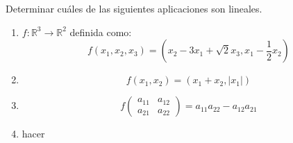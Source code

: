 \begin{enunciado}{\ejercicio}
  Determinar cuáles de las siguientes aplicaciones son lineales.
  \begin{enumerate}[label=(\alph*)]
  \item $f: \mathbb{R}^3 \to \mathbb{R}^2$ definida como:   \[
    f(x_1, x_2, x_3) = (x_2 - 3x_1 + \sqrt{2}x_3, x_1 - \frac{1}{2} x_2)
    \]
  \item \[f(x_1, x_2) = (x_1 + x_2, |x_1|)\]

  \item \[f \begin{pmatrix} a_{11} & a_{12} \\ a_{21} & a_{22} \end{pmatrix} =
  a_{11} a_{22} - a_{12} a_{21}
  \]
  \item hacer

  \end{enumerate}
\end{enunciado}

